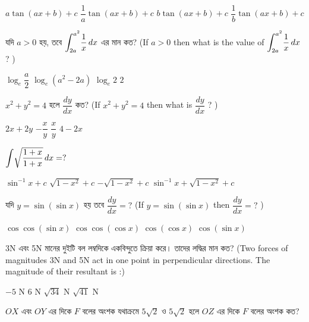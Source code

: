 \documentclass[addpoints]{exam}
\begin{document}
\begin{questions}
\begin{oneparchoices}
\choice $ a\tan (ax+b) + c $
\choice $ \dfrac{1}{a}\tan (ax+b) + c $
\choice $ b\tan (ax+b) + c $
\choice $ \dfrac{1}{b}\tan (ax+b) + c $
\end{oneparchoices}

\question যদি $ a>0 $ হয়, তবে $ \mathlarger{\int_{2a}^{a^{2}}}\dfrac{1}{x}\, dx$ এর মান কত? (If $ a>0 $ then what is the value of $ \mathlarger{\int_{2a}^{a^{2}}}\dfrac{1}{x}\, dx$ ? )

\begin{oneparchoices}
\choice $ \log_{e}\dfrac{a}{2} $
\choice $ \log_{e}(a^{2}-2a) $
\choice $ \log_{e}2 $
\choice $ 2 $
\end{oneparchoices}

\question $ x^{2}+y^{2}=4 $ হলে $ \dfrac{dy}{dx} $ কত? (If $ x^{2}+y^{2}=4 $ then what is $ \dfrac{dy}{dx} $ ? )

\begin{oneparchoices}
\choice  $ 2x+2y $
\choice  $ -\dfrac{x}{y} $
\choice  $\dfrac{x}{y} $
\choice  $ 4-2x $
\end{oneparchoices}


\question  $ \mathlarger{\int}\sqrt{\dfrac{1+x}{1+x}}\,dx = ? $

\begin{oneparchoices}
\choice $ \sin^{-1}x+c $
\choice $ \sqrt{1-x^{2}}+c $
\choice $ -\sqrt{1-x^{2}}+c $
\choice $ \sin^{-1}x+\sqrt{1-x^{2}}+c $
\end{oneparchoices}

\question  যদি $ y = \sin(\sin x) $ হয় তবে $ \dfrac{dy}{dx}=? $ (If $ y = \sin(\sin x) $ then $ \dfrac{dy}{dx}=? $ )

\begin{oneparchoices}
\choice $ \cos\cos(\sin x) $
\choice $ \cos\cos(\cos x) $
\choice $ \cos(\cos x) $
\choice $ \cos (\sin x) $
\end{oneparchoices}

\question 3N এবং 5N মানের দুইটি বল লম্বদিকে একবিন্দুতে ক্রিয়া করে। তাদের লদ্ধির মান কত? (Two forces of magnitudes 3N and 5N act in one point in perpendicular directions.  The magnitude of their resultant is :) 

\begin{oneparchoices}
\choice $ -5 $ N
\choice $ 6 $ N
\choice $ \sqrt{34} $ N
\choice $ \sqrt{41} $ N  
\end{oneparchoices}


\question $ OX $ এবং $ OY $ এর দিকে $ F $ বলের অংশক যথাক্রমে $ 5\sqrt{2} $ ও $ 5\sqrt{2} $ হলে $ OZ $ এর দিকে $ F $ বলের অংশক কত?


\end{questions}
\end{document}
